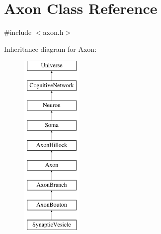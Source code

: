\hypertarget{classAxon}{}\section{Axon Class Reference}
\label{classAxon}


{\ttfamily \#include $<$axon.\+h$>$}

Inheritance diagram for Axon\+:\begin{figure}[H]
\begin{center}
\leavevmode
\includegraphics[height=9.000000cm]{classAxon}
\end{center}
\end{figure}
